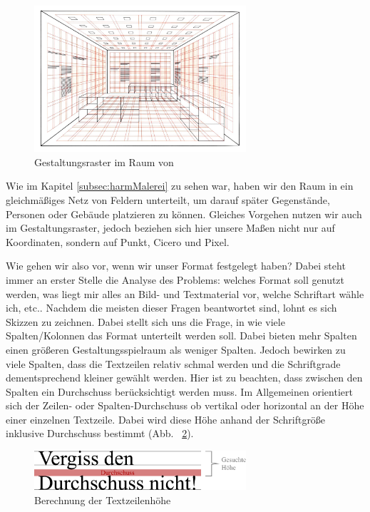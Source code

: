 \documentclass[12pt,a4paper]{article}
\begin{document}
\begin{figure}[htbp]
\centering
\includegraphics[width=0.7\textwidth]{Bilder/3d-grid_brockmann.jpeg}
\caption{Gestaltungsraster im Raum von \citep[S.~148]{gestaltungsraster}}
\label{fig:modernSatz}
\end{figure}

Wie im Kapitel \ref{subsec:harmMalerei} zu sehen war, haben wir den Raum in ein gleichmäßiges Netz von Feldern unterteilt, um darauf später Gegenstände, Personen oder Gebäude platzieren zu können. Gleiches Vorgehen nutzen wir auch im Gestaltungsraster, jedoch beziehen sich hier unsere Maßen nicht nur auf Koordinaten, sondern auf Punkt, Cicero und Pixel.

Wie gehen wir also vor, wenn wir unser Format festgelegt haben? Dabei steht immer an erster Stelle die Analyse des Problems: welches Format soll genutzt werden, was liegt mir alles an Bild- und Textmaterial vor, welche Schriftart wähle ich, etc.. Nachdem die meisten dieser Fragen beantwortet sind, lohnt es sich Skizzen zu zeichnen. Dabei stellt sich uns die Frage, in wie viele Spalten/Kolonnen das Format unterteilt werden soll. Dabei bieten mehr Spalten einen größeren Gestaltungsspielraum als weniger Spalten. Jedoch bewirken zu viele Spalten, dass die Textzeilen relativ schmal werden und die Schriftgrade dementsprechend kleiner gewählt werden. Hier ist zu beachten, dass zwischen den Spalten ein Durchschuss berücksichtigt werden muss. Im Allgemeinen orientiert sich der Zeilen- oder Spalten-Durchschuss ob vertikal oder horizontal an der Höhe einer einzelnen Textzeile. Dabei wird diese Höhe anhand der Schriftgröße inklusive Durchschuss bestimmt (Abb.~ \ref{fig:durchschuss}). 

\begin{figure}[htbp]
\centering
\includegraphics[width=0.7\textwidth]{Bilder/durchschuss.png}
\caption{Berechnung der Textzeilenhöhe}
\label{fig:durchschuss}
\end{figure}
\end{document}

